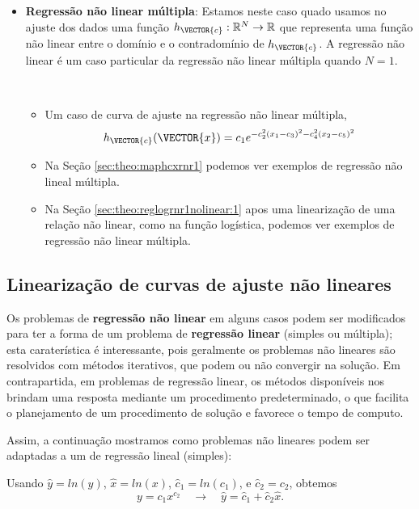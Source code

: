 \begin{itemize}
\item \textbf{Regressão não linear múltipla}: 
Estamos neste caso quado usamos no ajuste dos dados
uma função $h_{\VECTOR{c}}:\mathbb{R}^{N} \rightarrow \mathbb{R}$ 
que representa uma função não linear entre o domínio e o contradomínio de $h_{\VECTOR{c}}$.
A regressão não linear é um caso particular da regressão não linear múltipla quando $N=1$.
\begin{example}~
\begin{itemize}
\item Um caso de curva de ajuste na regressão não linear múltipla, 
\begin{equation}
h_{\VECTOR{c}}(\VECTOR{x})=c_1 e^{- c_2^2(x_1 -c_3)^2- c_4^2(x_2 -c_5)^2}
\end{equation}
\item Na Seção \ref{sec:theo:maphcxrnr1} podemos ver exemplos de regressão não lineal múltipla.
\item Na Seção \ref{sec:theo:reglogrnr1nolinear:1} apos uma linearização de uma relação não linear,
como na função logística, podemos ver exemplos de regressão não linear múltipla.
\end{itemize}
\end{example}
\end{itemize}

\subsection{Linearização de curvas de ajuste não lineares}

Os problemas de \textbf{regressão não linear}
em alguns casos podem ser modificados para ter a forma de um 
problema de \textbf{regressão linear} (simples ou múltipla);
esta caraterística é interessante, pois geralmente
os problemas não lineares são resolvidos com métodos iterativos,
que podem ou não convergir na solução.
Em contrapartida, em problemas de regressão linear,
os métodos disponíveis nos brindam uma resposta mediante um procedimento 
predeterminado, 
o que facilita o planejamento de um procedimento de solução e favorece o tempo de computo.

Assim, a continuação mostramos 
como problemas não lineares podem ser 
adaptadas a um de regressão lineal (simples):
\begin{example}%
Usando 
$\hat{y}=ln(y)$,  
$\hat{x}=ln(x)$, 
$\hat{c}_1=ln(c_1)$, e
$\hat{c}_2=c_2$, obtemos %
\begin{equation}
y=c_1x^{c_2}
\quad \rightarrow \quad 
\hat{y}=\hat{c}_1+\hat{c}_2 \hat{x}.
\end{equation}
\vspace{-2pt}
\end{example}

